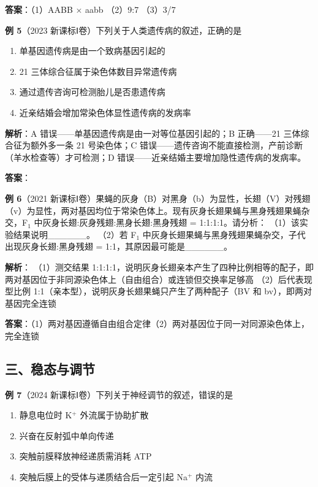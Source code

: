\textbf{答案}：（1）AABB $\times$ aabb （2）9:7 （3）3/7

\textbf{例 5}（2023 新课标Ⅰ卷）下列关于人类遗传病的叙述，正确的是
\begin{enumerate}
  \item[A.] 单基因遗传病是由一个致病基因引起的
  \item[B.] 21 三体综合征属于染色体数目异常遗传病
  \item[C.] 通过遗传咨询可检测胎儿是否患遗传病
  \item[D.] 近亲结婚会增加常染色体显性遗传病的发病率
\end{enumerate}

\textbf{解析}：A 错误——单基因遗传病是由一对等位基因引起的；B 正确——21 三体综合征为额外多一条 21 号染色体；C 错误——遗传咨询不能直接检测，产前诊断（羊水检查等）才可检测；D 错误——近亲结婚主要增加隐性遗传病的发病率。

\textbf{答案}：

\textbf{例 6}（2021 新课标Ⅰ卷）果蝇的灰身（B）对黑身（b）为显性，长翅（V）对残翅（v）为显性，两对基因均位于常染色体上。现有灰身长翅果蝇与黑身残翅果蝇杂交，F$_1$ 中灰身长翅:灰身残翅:黑身长翅:黑身残翅 = 1:1:1:1。请分析：
（1）该实验结果说明\_\_\_\_\_\_。
（2）若 F$_1$ 中灰身长翅果蝇与黑身残翅果蝇杂交，子代出现灰身长翅:黑身残翅 = 1:1，其原因最可能是\_\_\_\_\_\_。

\textbf{解析}：
（1）测交结果 1:1:1:1，说明灰身长翅亲本产生了四种比例相等的配子，即两对基因位于非同源染色体上（自由组合）或连锁但交换率足够高
（2）后代表现型比例 1:1（亲本型），说明灰身长翅果蝇只产生了两种配子（BV 和 bv），即两对基因完全连锁

\textbf{答案}：（1）两对基因遵循自由组合定律（2）两对基因位于同一对同源染色体上，完全连锁

\subsection{三、稳态与调节}

\textbf{例 7}（2024 新课标Ⅰ卷）下列关于神经调节的叙述，错误的是
\begin{enumerate}
  \item[A.] 静息电位时 K$^+$ 外流属于协助扩散
  \item[B.] 兴奋在反射弧中单向传递
  \item[C.] 突触前膜释放神经递质需消耗 ATP
  \item[D.] 突触后膜上的受体与递质结合后一定引起 Na$^+$ 内流
\end{enumerate}

